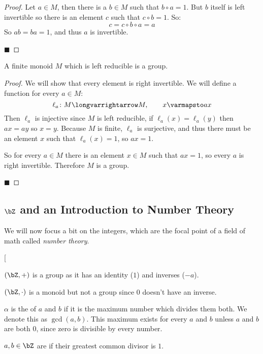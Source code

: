 \documentclass[10pt]{article}
\makeatletter
\def\@blist[#1]{%
    \bgroup\bgroup\par\vskip-\medskipamount%
    \gdef\item{%
        \par\egroup\bgroup\medskip\setbox0=\hbox{#1\quad}%
        \advance\leftskip by \wd0\leavevmode\kern-\wd0\box0%
    }%
}
\def\blist{\@ifnextchar[ \@blist {\@blist[$\bullet$]}}
\def\elist{\par\egroup\egroup\medskip}
\makeatother
\begin{document}
\begin{proof}

    Let $a\in M$, then there is a $b\in M$ such that $b\circ a=1$.
    But $b$ itself is left invertible so there is an element $c$ such that $c\circ b=1$.
    So:
        \[ c = c\circ b\circ a = a \]
    So $ab=ba=1$, and thus $a$ is invertible.

    \hfill$\blacksquare$

\end{proof}

\begin{thrm*}

    A finite monoid $M$ which is left reducible is a group.

\end{thrm*}

\begin{proof}

    We will show that every element is right invertible.
    We will define a function for every $a\in M$:
        \[ \ell_a\colon M\longvarrightarrow M,\qquad x\varmapsto ax \]
    Then $\ell_a$ is injective since $M$ is left reducible, if $\ell_a(x)=\ell_a(y)$ then $ax=ay$ so $x=y$.
    Because $M$ is finite, $\ell_a$ is surjective, and thus there must be an element $x$ such that $\ell_a(x)=1$, so $ax=1$.
    
    So for every $a\in M$ there is an element $x\in M$ such that $ax=1$, so every $a$ is right invertible.
    Therefore $M$ is a group.

    \hfill$\blacksquare$

\end{proof}

\subsection{$\bZ$ and an Introduction to Number Theory}

We will now focus a bit on the integers, which are the focal point of a field of math called \emph{number theory}.

\blist
    \item $(\bZ,+)$ is a group as it has an identity ($1$) and inverses ($-a$).
    \item $(\bZ,\cdot)$ is a monoid but not a group since $0$ doesn't have an inverse.
\elist

\begin{defn*}

    $\alpha$ is the  of $a$ and $b$ if it is the maximum number which divides them both.
    We denote this as $\gcd(a,b)$.
    This maximum exists for every $a$ and $b$ unless $a$ and $b$ are both $0$, since zero is divisible by every number.

    $a,b\in\bZ$ are  if their greatest common divisor is $1$.

\end{defn*}
\end{document}
